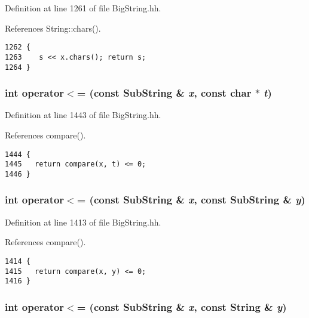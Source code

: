 Definition at line 1261 of file Big\-String.hh.

References String::chars().



\footnotesize\begin{verbatim}1262 {
1263    s << x.chars(); return s;
1264 }
\end{verbatim}\normalsize 
{}
\subsubsection{\setlength{\rightskip}{0pt plus 5cm}int operator$<$= (const {\bf Sub\-String} \& {\em x}, const char $\ast$ {\em t})\hspace{0.3cm}{\tt  [inline]}}\label{BigString_8hh_a121}




Definition at line 1443 of file Big\-String.hh.

References compare().



\footnotesize\begin{verbatim}1444 {
1445   return compare(x, t) <= 0; 
1446 }
\end{verbatim}\normalsize 
{}
\subsubsection{\setlength{\rightskip}{0pt plus 5cm}int operator$<$= (const {\bf Sub\-String} \& {\em x}, const {\bf Sub\-String} \& {\em y})\hspace{0.3cm}{\tt  [inline]}}\label{BigString_8hh_a115}




Definition at line 1413 of file Big\-String.hh.

References compare().



\footnotesize\begin{verbatim}1414 {
1415   return compare(x, y) <= 0;
1416 }
\end{verbatim}\normalsize 
{}
\subsubsection{\setlength{\rightskip}{0pt plus 5cm}int operator$<$= (const {\bf Sub\-String} \& {\em x}, const {\bf String} \& {\em y})\hspace{0.3cm}{\tt  [inline]}}\label{BigString_8hh_a109}




